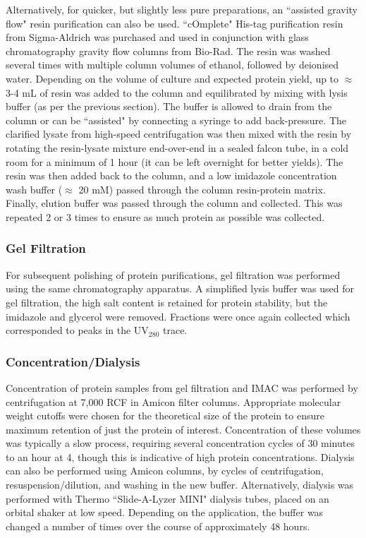 Alternatively, for quicker, but slightly less pure preparations, an ``assisted gravity flow" resin purification can also be used. ``cOmplete" His-tag purification resin from Sigma-Aldrich was purchased and used in conjunction with glass chromatography gravity flow columns from Bio-Rad. The resin was washed several times with multiple column volumes of ethanol, followed by deionised water. Depending on the volume of culture and expected protein yield, up to $\approx$ 3-4 mL of resin was added to the column and equilibrated by mixing with lysis buffer (as per the previous section). The buffer is allowed to drain from the column or can be ``assisted" by connecting a syringe to add back-pressure. The clarified lysate from high-speed centrifugation was then mixed with the resin by rotating the resin-lysate mixture end-over-end in a sealed falcon tube, in a cold room for a minimum of 1 hour (it can be left overnight for better yields). The resin was then added back to the column, and a low imidazole concentration wash buffer ($\approx$ 20 mM) passed through the column resin-protein matrix. Finally, elution buffer was passed through the column and collected. This was repeated 2 or 3 times to ensure as much protein as possible was collected.

\subsubsection{Gel Filtration}
For subsequent polishing of protein purifications, gel filtration was performed using the same chromatography apparatus. A simplified lysis buffer was used for gel filtration, the high salt content is retained for protein stability, but the imidazole and glycerol were removed. Fractions were once again collected which corresponded to peaks in the UV$_{280}$ trace.
	
\subsubsection{Concentration/Dialysis}
Concentration of protein samples from gel filtration and IMAC was performed by centrifugation at 7,000 RCF in Amicon filter columns. Appropriate molecular weight cutoffs were chosen for the theoretical size of the protein to ensure maximum retention of just the protein of interest. Concentration of these volumes was typically a slow process, requiring several concentration cycles of 30 minutes to an hour at 4\degC, though this is indicative of high protein concentrations. Dialysis can also be performed using Amicon columns, by cycles of centrifugation, resuspension/dilution, and washing in the new buffer. Alternatively, dialysis was performed with Thermo ``Slide-A-Lyzer MINI" dialysis tubes, placed on an orbital shaker at low speed. Depending on the application, the buffer was changed a number of times over the course of approximately 48 hours.

